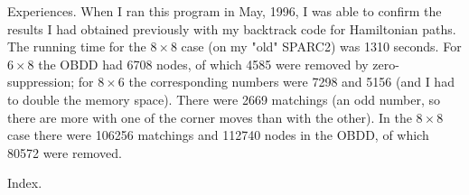 Experiences. When I ran this program in May, 1996, I was
able to
confirm the results I had obtained previously with my backtrack code for
Hamiltonian paths. The running time for the $8\times8$ case (on my "old"
SPARC2) was 1310 seconds. For $6\times8$ the OBDD had 6708 nodes, of which
4585 were removed by zero-suppression; for $8\times6$ the corresponding
numbers were 7298 and 5156 (and I had to double the memory space).
There were 2669 matchings (an odd number, so there are more with one of the
corner moves than with the other). In the $8\times8$ case there were 106256
matchings and 112740 nodes in the OBDD, of which 80572 were removed.

\fi

Index.
\fi

\inx
\fin
\con
